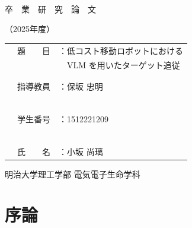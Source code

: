 \documentclass[a4paper,11pt]{ltjsreport}
\begin{document}
\begin{titlepage}
  \centering
  ~~\vspace{1cm}
 
  {\Huge 卒　業　研　究　論　文 \par}
  {\Huge （2025年度）\par}

  \vspace{8cm}

  \begin{tabular}{rl}
    {\LARGE 題　　目}　 & {\LARGE ：低コスト移動ロボットにおける} \\
                         & {\LARGE ~~VLM を用いたターゲット追従} \\ \\ \\
    {\LARGE 指導教員}　 & {\LARGE ：保坂 忠明} \\　 \\ \\
    {\LARGE 学生番号}　 & {\LARGE ：1512221209} \\　 \\ \\
    {\LARGE 氏　　名}　 & {\LARGE ：小坂 尚璃}
  \end{tabular}

  \vfil
  \begin{flushright}
    明治大学理工学部 電気電子生命学科
  \end{flushright}
\end{titlepage}

\tableofcontents

\chapter{序論}
\label{chap:intro}
\end{document}

